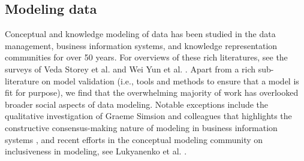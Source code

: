 \subsection{Modeling data}

Conceptual and knowledge modeling of data has been studied in the data management, business information systems, and knowledge representation communities for over 50 years.  For overviews of these rich literatures, see the surveys of Veda Storey et al. \cite{akoka,storey} and Wei Yun et al. \cite{yun2021}.  Apart from a rich sub-literature on model validation (i.e., tools and methods to ensure that a model is fit for purpose), we find that the overwhelming majority of work has overlooked broader social aspects of data modeling.   Notable exceptions include the qualitative investigation of Graeme Simsion and colleagues that highlights the constructive consensus-making nature of modeling in business information systems \cite{simsion}, and recent efforts in the conceptual modeling community on inclusiveness in modeling, see  Lukyanenko et al. \cite{LukyanenkoBSP023}.